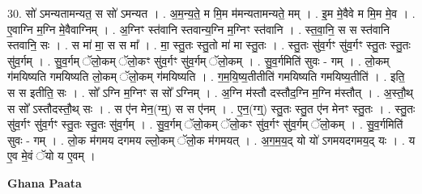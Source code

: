 \documentclass[17pt]{extarticle}
\begin{document}
30. सो॑ ऽमन्यतामन्यत॒ स सो॑ ऽमन्यत । . अ॒म॒न्य॒ते॒ म मि॒म म॑मन्यतामन्यते॒ मम् । . इ॒म मे॒वैवे म मि॒म मे॒व । . ए॒वाग्नि म॒ग्नि मे॒वैवाग्निम् । . अ॒ग्निꣳ स्त॑वानि स्तवान्य॒ग्नि म॒ग्निꣳ स्त॑वानि । . स्त॒वा॒नि॒ स स स्त॑वानि स्तवानि॒ सः । . स मा॑ मा॒ स स मा᳚ । . मा॒ स्तु॒तः स्तु॒तो मा॑ मा स्तु॒तः । . स्तु॒तः सु॑व॒र्गꣳ सु॑व॒र्गꣳ स्तु॒तः स्तु॒तः सु॑व॒र्गम् । . सु॒व॒र्गम् ॅलो॒कम् ॅलो॒कꣳ सु॑व॒र्गꣳ सु॑व॒र्गम् ॅलो॒कम् । . सु॒व॒र्गमिति॑ सुवः - गम् । . लो॒कम् ग॑मयिष्यति गमयिष्यति लो॒कम् ॅलो॒कम् ग॑मयिष्यति । . ग॒म॒यि॒ष्य॒तीतीति॑ गमयिष्यति गमयिष्य॒तीति॑ । . इति॒ स स इतीति॒ सः । . सो᳚ ऽग्नि म॒ग्निꣳ स सो᳚ ऽग्निम् । . अ॒ग्नि म॑स्तौ दस्तौद॒ग्नि म॒ग्नि म॑स्तौत् । . अ॒स्तौ॒थ् स सो᳚ ऽस्तौदस्तौ॒थ् सः । . स ए॑न मेन॒(ग्म्॒) स स ए॑नम् । . ए॒न॒(ग्ग्॒) स्तु॒तः स्तु॒त ए॑न मेनꣳ स्तु॒तः । . स्तु॒तः सु॑व॒र्गꣳ सु॑व॒र्गꣳ स्तु॒तः स्तु॒तः सु॑व॒र्गम् । . सु॒व॒र्गम् ॅलो॒कम् ॅलो॒कꣳ सु॑व॒र्गꣳ सु॑व॒र्गम् ॅलो॒कम् । . सु॒व॒र्गमिति॑ सुवः - गम् । . लो॒क म॑गमय दगमय ल्लो॒कम् ॅलो॒क म॑गमयत् । . अ॒ग॒म॒य॒द् यो यो॑ ऽगमयदगमय॒द् यः । . य ए॒व मे॒वं ॅयो य ए॒वम् । \newline

\textbf{Ghana Paata } \newline
\end{document}
